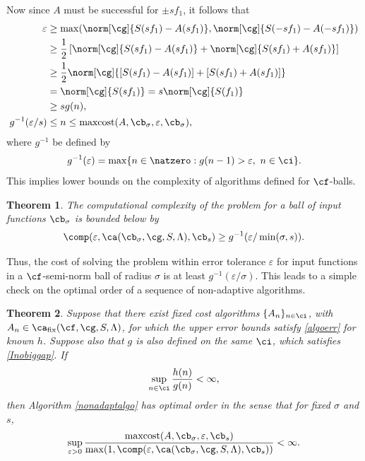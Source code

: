 \documentclass[]{elsarticle}
\DeclareMathOperator{\fix}{fix}
\DeclareMathOperator{\maxcost}{maxcost}
\newtheorem{theorem}{Theorem}
\theoremstyle{definition}
\theoremstyle{remark}
\begin{document}
Now since $A$ must be successful for $\pm s f_1$, it follows that 
\begin{align*}
\varepsilon & \ge \max(\norm[\cg]{S(sf_1)-A(sf_1)},\norm[\cg]{S(-sf_1)-A(-sf_1)}) \\
& \ge \frac{1}{2} \left[ \norm[\cg]{S(sf_1)-A(sf_1)}+ \norm[\cg]{S(sf_1)+A(sf_1)} \right] \\
& \ge \frac{1}{2} \norm[\cg]{[S(sf_1)-A(sf_1)]+[S(sf_1)+A(sf_1)]} \\
& = \norm[\cg]{S(sf_1)}= s\norm[\cg]{S(f_1)}  \\
& \ge s g(n),\\
g^{-1}(\varepsilon/s) & \le n \le \maxcost(A,\cb_{\sigma},\varepsilon,\cb_{\sigma}),
\end{align*}
where $g^{-1}$ be defined by
\begin{equation*} \label{ginvdef}
g^{-1}(\varepsilon) = \max \{ n \in \natzero : g(n-1) > \varepsilon, \ n \in \ci \}.
\end{equation*}
This implies lower bounds on the complexity of algorithms defined for $\cf$-balls.

\begin{theorem} \label{complowbdball} The computational complexity of the problem for a ball of input functions $\cb_{\sigma}$ is bounded below by
\begin{equation*}
\comp(\varepsilon,\ca(\cb_{\sigma},\cg,S,\Lambda),\cb_s) \ge
g ^{-1}(\varepsilon/\min(\sigma,s)).
\end{equation*}
\end{theorem}
Thus, the cost of solving the problem within error tolerance $\varepsilon$ for input functions in a $\cf$-semi-norm ball of radius $\sigma$ is at least $g^{-1}(\varepsilon/\sigma)$.  This leads to a simple check on the optimal order of a sequence of non-adaptive algorithms.

\begin{theorem} \label{optimalprop} Suppose that there exist fixed cost algorithms $\{A_n\}_{n \in \ci}$, with $A_n  \in \ca_{\fix}(\cf,\cg,S,\Lambda)$, for which the upper error bounds satisfy \eqref{algoerr} for known $h$.  Suppose also that $g$ is also defined on the same $\ci$, which satisfies \eqref{Inobiggap}. If 
\begin{equation}\label{ghcond}
\sup_{n \in \ci} \frac{h(n)}{g(n)} < \infty,
\end{equation}
then Algorithm \ref{nonadaptalgo} has optimal order in the sense that for fixed $\sigma$ and $s$, 
\begin{equation*} \label{balloptresult}
\sup_{\varepsilon > 0} \frac{\maxcost(A,\cb_{\sigma},\varepsilon,\cb_{s})}
{\max(1,\comp(\varepsilon,\ca(\cb_{\sigma},\cg,S,\Lambda),\cb_s))} <\infty.
\end{equation*}
\end{theorem}
\end{document}
